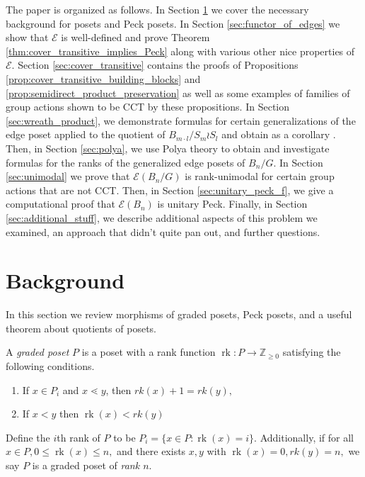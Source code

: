 \documentclass[10 pt]{amsart}
\theoremstyle{plain}
\theoremstyle{definition}
\theoremstyle{remark}
\numberwithin{equation}{section}
\newcommand\BZ{{\mathbb Z}}
\newcommand\rk{\operatorname{rk}}
\begin{document}

The paper is organized as follows. In Section \ref{sec:background} we cover the necessary background for posets and Peck posets.  In Section \ref{sec:functor_of_edges} we show that $\mathcal E$ is well-defined and prove Theorem \ref{thm:cover_transitive_implies_Peck} along with various other nice properties of $\mathcal E$. Section \ref{sec:cover_transitive} contains the proofs of Propositions \ref{prop:cover_transitive_building_blocks} and \ref{prop:semidirect_product_preservation} as well as some examples of families of group actions shown to be CCT by these propositions. In Section \ref{sec:wreath_product}, we demonstrate formulas for certain generalizations of the edge poset applied to the quotient of $B_{m \cdot l}/S_m \wr S_l$ and obtain as a corollary \cite[Theorem 1.1]{pak}. Then, in Section \ref{sec:polya}, we use Polya theory to obtain and investigate formulas for the ranks of the generalized edge posets of $B_n/G.$ In Section \ref{sec:unimodal} we prove that $\mathcal E(B_n/G)$ is rank-unimodal for certain group actions that are not CCT. Then, in Section \ref{sec:unitary_peck_f}, we give a computational proof that $\mathcal E(B_n)$ is unitary Peck. Finally, in Section \ref{sec:additional_stuff}, we describe additional aspects of this problem we examined, an approach that didn't quite pan out, and further questions.



\section{Background}\label{sec:background}
In this section we review morphisms of graded posets, Peck posets, and a useful theorem about quotients of posets. 

A {\it graded poset} $P$ is a poset with a rank function $\rk:P \rightarrow \BZ_{\geq 0}$ satisfying the following conditions.
\begin{enumerate}
	\item If $x\in P_i$ and $x\lessdot y$, then $rk(x) + 1 = rk(y),$
	\item If $x < y$ then $\rk(x) < rk(y)$ 
\end{enumerate}

Define the $i$th rank of $P$ to be  $P_i = \{x \in P\colon\rk(x) = i\}.$ Additionally, if for all $x\in P,0 \leq \rk(x) \leq n,$ and there exists $x,y$ with $\rk(x) = 0, rk(y) = n,$ we say $P$ is a graded poset of {\it rank $n$}.
\end{document}

